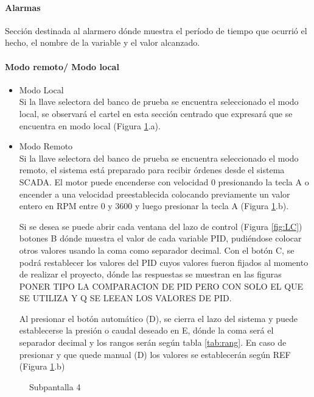 \paragraph{Alarmas}
Sección destinada al alarmero dónde muestra el período de tiempo que ocurrió el hecho, el nombre de la variable y el valor alcanzado.
\paragraph{Modo remoto/ Modo local}
\begin{itemize}
	\item Modo Local\\
	Si la llave selectora del banco de prueba se encuentra seleccionado el modo local, se observará el cartel en esta sección centrado que expresará que se encuentra en modo local (Figura \ref{fig:localremoto}.a).
	\item Modo Remoto\\
	Si la llave selectora del banco de prueba se encuentra seleccionado el modo remoto, el sistema está preparado para recibir órdenes desde el sistema SCADA. El motor puede encenderse con velocidad 0 presionando la tecla A o encender a una velocidad preestablecida colocando previamente un valor entero en RPM entre 0 y 3600 y luego presionar la tecla A (Figura \ref{fig:localremoto}.b). 
	
	Si se desea se puede abrir cada ventana del lazo de control (Figura \ref{fig:LC}) botones B dónde muestra el valor de cada variable PID, pudiéndose colocar otros valores usando la coma como separador decimal. Con el botón C, se podrá restablecer los valores del PID cuyos valores fueron fijados al momento de realizar el proyecto, dónde las respuestas se muestran en las figuras PONER TIPO LA COMPARACION DE PID PERO CON SOLO EL QUE SE UTILIZA Y Q SE LEEAN LOS VALORES DE PID. 
	
	Al presionar el botón automático (D), se cierra el lazo del sistema y puede establecerse la presión o caudal deseado en E, dónde la coma será el separador decimal y los rangos serán según tabla \ref{tab:rang}. En caso de presionar y que quede manual (D) los valores se establecerán según REF (Figura \ref{fig:localremoto}.b) 
\end{itemize}

\begin{figure}[htbp]
	\centering
	\caption{Subpantalla 4} \label{fig:localremoto}
\end{figure}

